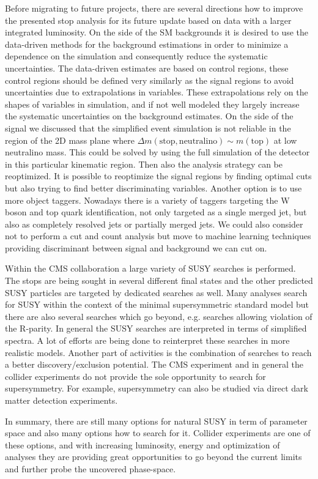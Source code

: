 Before migrating to future projects, there are several directions how to improve the presented stop analysis for its future update based on data with a larger integrated luminosity. On the side of the SM backgrounds it is desired to use the data-driven methods for the background estimations in order to minimize a dependence on the simulation and consequently reduce the systematic uncertainties. The data-driven estimates are based on control regions, these control regions should be defined very similarly as the signal regions to avoid uncertainties due to extrapolations in variables.  These extrapolations rely on the shapes of variables in simulation, and if not well modeled they largely increase the systematic uncertainties on the background estimates. On the side of the signal we discussed that the simplified event simulation is not reliable in the region of the 2D mass plane where $\Delta m(\mathrm{stop, neutralino}) \sim m(\mathrm{top})$ at low neutralino mass. This could be solved by using the full simulation of the detector in this particular kinematic region. Then also the analysis strategy can be reoptimized. It is possible to reoptimize the signal regions by finding optimal cuts but also trying to find better discriminating variables. Another option is to use more object taggers. Nowadays there is a variety of taggers targeting the W boson and top quark identification, not only targeted as a  single merged jet, but also as completely resolved jets or partially merged jets. We could also consider not to perform a cut and count analysis but move to machine learning techniques providing discriminant between signal and background we can cut on. 


Within the CMS collaboration a large variety of SUSY searches is performed. The stops are being sought in several different final states and the other predicted SUSY particles are targeted by dedicated searches as well. Many analyses search for SUSY within the context of the minimal supersymmetric standard model but there are also several searches which go beyond, e.g. searches allowing violation of the R-parity. In general the SUSY searches are interpreted in terms of simplified spectra. A lot of efforts are being done to reinterpret these searches in more realistic models. Another part of activities is the combination of searches to reach a better discovery/exclusion potential. The CMS experiment and in general the collider experiments do not provide the sole opportunity to search for supersymmetry. For example, supersymmetry can also be studied via direct dark matter detection experiments. 

In summary, there are still many options for natural SUSY in term of parameter space and also many options how to search for it. Collider experiments are one of these options, and with increasing luminosity, energy and optimization of analyses they are providing great opportunities to go beyond the current limits and further probe the uncovered phase-space.

